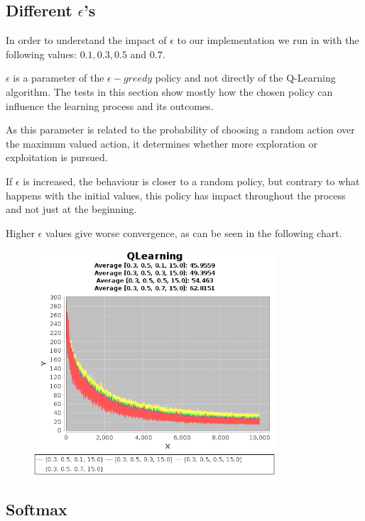 \documentclass{article}
\begin{document}
\subsection{Different $\epsilon$'s}
\label{ep}
In order to understand the impact of $\epsilon$ to our implementation we run
in with the following values:
$0.1, 0.3, 0.5$ and $0.7$.

$\epsilon$ is a parameter of the $\epsilon-greedy$ policy and not directly of the Q-Learning algorithm. The tests in this section show mostly how the chosen policy can
influence the learning process and its outcomes. 

As this parameter is related to the probability of choosing a random action over
the maximum valued action, it determines whether more exploration or exploitation is pursued.

If $\epsilon$ is increased, the behaviour is closer to a random
policy, but contrary to what happens with the initial values, this policy has
impact throughout the process and not just at the beginning.

Higher $\epsilon$ values give worse convergence, as can be seen in the following
chart.

\begin{figure}[htbp]
\centering
\includegraphics[width=0.8\textwidth]{res/alpha_03_gama_05_epsilon_01_to_07_IV_15.png}
\end{figure}

\subsection{Softmax}
\label{softmax}
\end{document}
